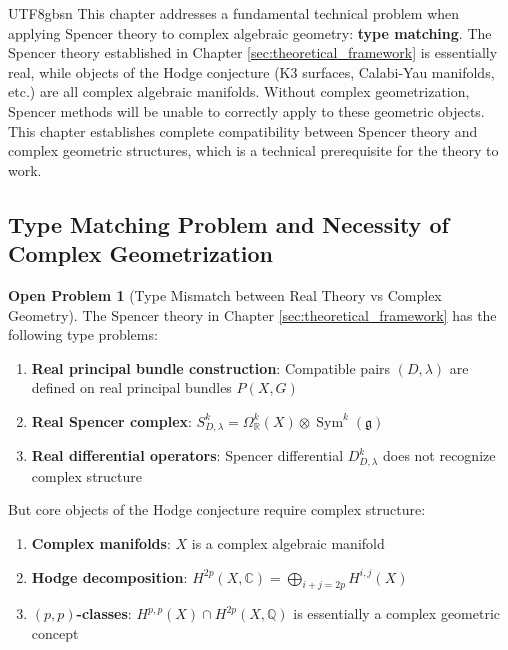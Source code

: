 \documentclass[a4paper,12pt]{extarticle}
\theoremstyle{definition}
\newtheorem{problem}{Open Problem}[section]
\begin{document}
\begin{CJK}{UTF8}{gbsn}
This chapter addresses a fundamental technical problem when applying Spencer theory to complex algebraic geometry: \textbf{type matching}. The Spencer theory established in Chapter \ref{sec:theoretical_framework} is essentially real, while objects of the Hodge conjecture (K3 surfaces, Calabi-Yau manifolds, etc.) are all complex algebraic manifolds. Without complex geometrization, Spencer methods will be unable to correctly apply to these geometric objects. This chapter establishes complete compatibility between Spencer theory and complex geometric structures, which is a technical prerequisite for the theory to work.

\subsection{Type Matching Problem and Necessity of Complex Geometrization}
\label{subsec:type_matching_necessity}

\begin{problem}[Type Mismatch between Real Theory vs Complex Geometry]
\label{prob:type_mismatch}
The Spencer theory in Chapter \ref{sec:theoretical_framework} has the following type problems:
\begin{enumerate}
    \item \textbf{Real principal bundle construction}: Compatible pairs $(D,\lambda)$ are defined on real principal bundles $P(X,G)$
    \item \textbf{Real Spencer complex}: $S^k_{D,\lambda} = \Omega^k_{\mathbb{R}}(X) \otimes \operatorname{Sym}^k(\mathfrak{g})$
    \item \textbf{Real differential operators}: Spencer differential $D^k_{D,\lambda}$ does not recognize complex structure
\end{enumerate}

But core objects of the Hodge conjecture require complex structure:
\begin{enumerate}
    \item \textbf{Complex manifolds}: $X$ is a complex algebraic manifold
    \item \textbf{Hodge decomposition}: $H^{2p}(X,\mathbb{C}) = \bigoplus_{i+j=2p} H^{i,j}(X)$
    \item \textbf{$(p,p)$-classes}: $H^{p,p}(X) \cap H^{2p}(X,\mathbb{Q})$ is essentially a complex geometric concept
\end{enumerate}
\end{problem}


\end{CJK}
\end{document}
